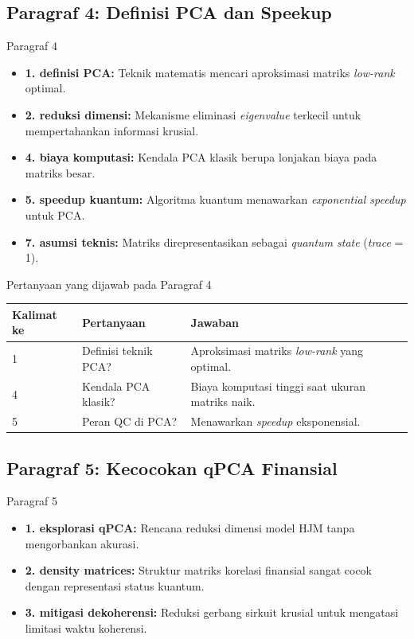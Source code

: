 \subsection{Paragraf 4: Definisi PCA dan Speekup}
\begin{frame}{Paragraf 4}
    \begin{itemize}
        \item \textbf{1. definisi PCA:} Teknik matematis mencari aproksimasi matriks \textit{low-rank} optimal.
        \item \textbf{2. reduksi dimensi:} Mekanisme eliminasi \textit{eigenvalue} terkecil untuk mempertahankan informasi krusial.
        \item \textbf{4. biaya komputasi:} Kendala PCA klasik berupa lonjakan biaya pada matriks besar.
        \item \textbf{5. speedup kuantum:} Algoritma kuantum menawarkan \textit{exponential speedup} untuk PCA.
        \item \textbf{7. asumsi teknis:} Matriks direpresentasikan sebagai \textit{quantum state} (\textit{trace} = 1).
    \end{itemize}
\end{frame}

\begin{frame}{Pertanyaan yang dijawab pada Paragraf 4}
    \centering
    \small
    \begin{tabular}{lp{4.5cm}p{6cm}}
        \toprule
        Kalimat ke & Pertanyaan & Jawaban \\
        \midrule
        1 & Definisi teknik PCA? & Aproksimasi matriks \textit{low-rank} yang optimal. \\
        4 & Kendala PCA klasik? & Biaya komputasi tinggi saat ukuran matriks naik. \\
        5 & Peran QC di PCA? & Menawarkan \textit{speedup} eksponensial. \\
        \bottomrule
    \end{tabular}
\end{frame}

\subsection{Paragraf 5: Kecocokan qPCA Finansial}
\begin{frame}{Paragraf 5}
    \begin{itemize}
        \item \textbf{1. eksplorasi qPCA:} Rencana reduksi dimensi model HJM tanpa mengorbankan akurasi.
        \item \textbf{2. density matrices:} Struktur matriks korelasi finansial sangat cocok dengan representasi status kuantum.
        \item \textbf{3. mitigasi dekoherensi:} Reduksi gerbang sirkuit krusial untuk mengatasi limitasi waktu koherensi.
    \end{itemize}
\end{frame}

